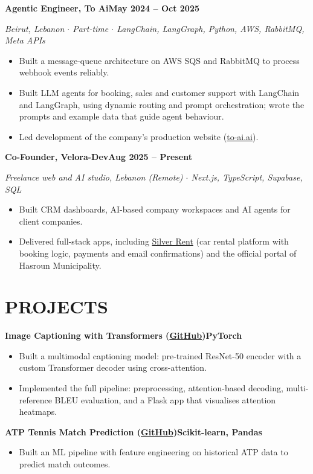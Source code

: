 \documentclass[10pt, a4paper]{article}
\newcommand{\entry}[2]{\vspace{5pt}\textbf{#1}\hfill\textbf{#2}\par}
\newcommand{\sub}[1]{\textit{#1}\par}
\begin{document}
\entry{Agentic Engineer, To Ai}{May 2024 -- Oct 2025}
\sub{Beirut, Lebanon $\cdot$ Part-time $\cdot$ LangChain, LangGraph, Python, AWS, RabbitMQ, Meta APIs}
\begin{itemize}
    \item Built a message-queue architecture on AWS SQS and RabbitMQ to process webhook events reliably.
    \item Built LLM agents for booking, sales and customer support with LangChain and LangGraph, using dynamic routing and prompt orchestration; wrote the prompts and example data that guide agent behaviour.
    \item Led development of the company's production website (\href{https://to-ai.ai}{to-ai.ai}).
\end{itemize}

\entry{Co-Founder, Velora-Dev}{Aug 2025 -- Present}
\sub{Freelance web and AI studio, Lebanon (Remote) $\cdot$ Next.js, TypeScript, Supabase, SQL}
\begin{itemize}
    \item Built CRM dashboards, AI-based company workspaces and AI agents for client companies.
    \item Delivered full-stack apps, including \href{https://www.silver-rent.be}{Silver Rent} (car rental platform with booking logic, payments and email confirmations) and the official portal of Hasroun Municipality.
\end{itemize}

\section*{PROJECTS}
\entry{Image Captioning with Transformers (\href{https://github.com/Farrous05/image-caption-transformer}{GitHub})}{PyTorch}
\begin{itemize}
    \item Built a multimodal captioning model: pre-trained ResNet-50 encoder with a custom Transformer decoder using cross-attention.
    \item Implemented the full pipeline: preprocessing, attention-based decoding, multi-reference BLEU evaluation, and a Flask app that visualises attention heatmaps.
\end{itemize}

\entry{ATP Tennis Match Prediction (\href{https://github.com/Farrous05/atp-tennis-ml}{GitHub})}{Scikit-learn, Pandas}
\begin{itemize}
    \item Built an ML pipeline with feature engineering on historical ATP data to predict match outcomes.
\end{itemize}
\end{document}
